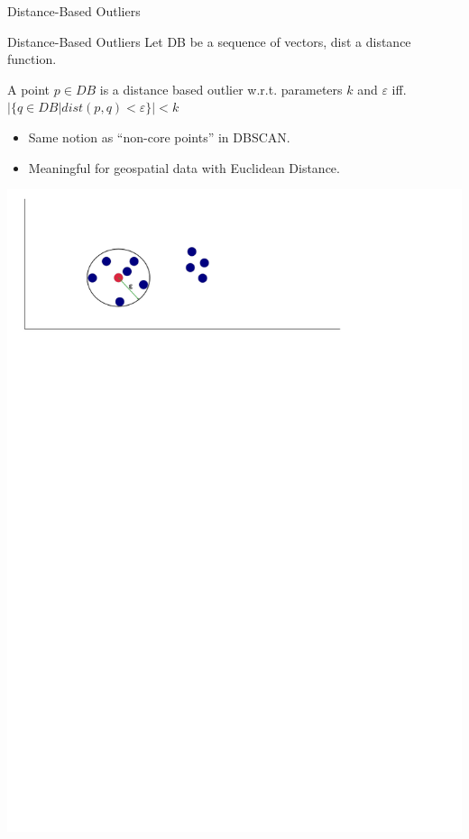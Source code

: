 \documentclass{beamer}
\begin{document}
\begin{frame}{Distance-Based Outliers}
    \begin{block}{Distance-Based Outliers}
        Let DB be a sequence of vectors, dist a distance function.

        A point $p\in DB$ is a distance based outlier w.r.t. parameters $k$ and $\varepsilon$
        iff. $|\{q\in DB | dist(p,q) < \varepsilon\}| < k$
    \end{block}

    \begin{itemize}
        \item Same notion as ``non-core points'' in DBSCAN.
        \item Meaningful for geospatial data with Euclidean Distance.
    \end{itemize}
    \centering
    \includegraphics[width=\textwidth]{images/dboutliers.png}
    
\end{frame}
\end{document}
